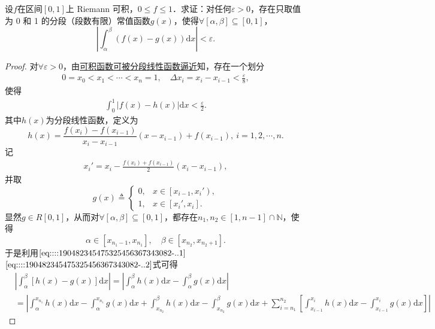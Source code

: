 \documentclass[../../main.tex]{subfiles}
\begin{document}
\begin{example}
设\( f \)在区间\( [0,1] \)上 Riemann 可积，\( 0 \leqslant f \leqslant 1 \)．求证：对任何\( \varepsilon > 0 \)，存在只取值为 0 和 1 的分段（段数有限）常值函数\( g(x) \)，使得\( \forall [\alpha, \beta] \subseteq [0,1] \)，
\[
\left| \int_{\alpha}^{\beta} (f(x) - g(x)) \mathrm{d}x \right| < \varepsilon.
\]
\end{example}
\begin{proof}
对\(\forall \varepsilon > 0\)，由\hyperref[theorem:可积被连续函数逼近]{可积函数可被分段线性函数逼近}知，存在一个划分
\begin{align}
0 = x_0 < x_1 < \cdots < x_n = 1, \quad \Delta x_i = x_i - x_{i-1} < \frac{\varepsilon}{8}, \label{eq::::190482345475325456367343082-..1}
\end{align}
使得
\begin{align}
\int_0^1 \left| f(x) - h(x) \right| \mathrm{d}x < \frac{\varepsilon}{2}. \label{eq::::190482345475325456367343082-..3}
\end{align}
其中\( h(x) \)为分段线性函数，定义为
\[
h(x) = \frac{f(x_i) - f(x_{i-1})}{x_i - x_{i-1}} \left( x - x_{i-1} \right) + f(x_{i-1}), \ i = 1,2,\cdots,n.
\]
记
\begin{align}
x_i' = x_i - \frac{f(x_i) + f(x_{i-1})}{2} \left( x_i - x_{i-1} \right), \label{eq::::190482345475325456367343082-..2}
\end{align}
并取
\[
g(x) \triangleq \begin{cases}
0, & x \in \left[ x_{i-1}, x_i' \right), \\
1, & x \in \left[ x_i', x_i \right].
\end{cases}
\]
显然\( g \in R[0,1] \)，从而对\(\forall [\alpha, \beta] \subseteq [0,1] \)，都存在\( n_1, n_2 \in [1, n-1] \cap \mathbb{N} \)，使得
\[
\alpha \in \left[ x_{n_1 - 1}, x_{n_1} \right], \quad \beta \in \left[ x_{n_2}, x_{n_2 + 1} \right].
\]
于是利用\(\eqref{eq::::190482345475325456367343082-..1}\)\(\eqref{eq::::190482345475325456367343082-..2}\)式可得
\begin{align*}
&\left| \int_{\alpha}^{\beta}{\left[ h\left( x \right) -g\left( x \right) \right] \mathrm{d}x} \right|=\left| \int_{\alpha}^{\beta}{h\left( x \right) \mathrm{d}x}-\int_{\alpha}^{\beta}{g\left( x \right) \mathrm{d}x} \right|
\\
&=\left| \int_{\alpha}^{x_{n_1}}{h\left( x \right) \mathrm{d}x}-\int_{\alpha}^{x_{n_1}}{g\left( x \right) \mathrm{d}x}+\int_{x_{n_2}}^{\beta}{h\left( x \right) \mathrm{d}x}-\int_{x_{n_2}}^{\beta}{g\left( x \right) \mathrm{d}x}+\sum_{i=n_1}^{n_2}{\left[ \int_{x_{i-1}}^{x_i}{h\left( x \right) \mathrm{d}x}-\int_{x_{i-1}}^{x_i}{g\left( x \right) \mathrm{d}x} \right]} \right|

\end{align*}
\end{proof}
\end{document}

